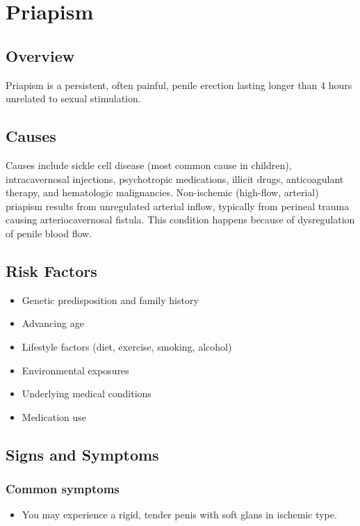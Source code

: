 \chapter{Priapism}
\label{sec:Priapism}

\section{Overview}
Priapism is a persistent, often painful, penile erection lasting longer than 4 hours unrelated to sexual stimulation.
\section{Causes}
Causes include sickle cell disease (most common cause in children), intracavernosal injections, psychotropic medications, illicit drugs, anticoagulant therapy, and hematologic malignancies. Non-ischemic (high-flow, arterial) priapism results from unregulated arterial inflow, typically from perineal trauma causing arteriocavernosal fistula. This condition happens because of dysregulation of penile blood flow.     
\section{Risk Factors}

\begin{itemize}[noitemsep]
  \item Genetic predisposition and family history
  \item Advancing age
  \item Lifestyle factors (diet, exercise, smoking, alcohol)
  \item Environmental exposures
  \item Underlying medical conditions
  \item Medication use
\end{itemize}
\section{Signs and Symptoms}

\subsection{Common symptoms}
\begin{itemize}[noitemsep]
  \item You may experience a rigid, tender penis with soft glans in ischemic type. 
  \end{itemize}

